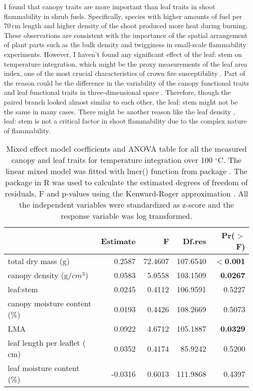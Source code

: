 \documentclass[12pt]{report}
\begin{document}
I found that canopy traits are more important than leaf traits in shoot flammability in shrub fuels.
Specifically, species with higher amounts of fuel per 70\,cm length and higher density of the shoot produced more heat during burning. These observations are consistent with the importance of the spatial arrangement of plant parts such as the bulk density \citep{pausas2012fire} and twigginess \citep{potts2022growth} in small-scale flammability experiments. However, I haven't found any significant effect of the leaf: stem on temperature integration, which might be the proxy measurements of the leaf area index, one of the most crucial characteristics of crown fire susceptibility \citep{ray2005micrometeorological}. Part of the reason could be the difference in the variability of the canopy functional traits and leaf functional traits in three-dimensional space \citep{kamoske2021leaf}. Therefore, though the paired branch looked almost similar to each other, the leaf: stem might not be the same in many cases. There might be another reason like the leaf density \citep{potts2022growth}, leaf: stem is not a critical factor in shoot flammability due to the complex nature of flammability.

\begin{table}[ht]
\centering
\caption{Mixed effect model coefficients and ANOVA table for all the measured canopy and leaf traits for temperature integration over 100 $^{\circ}$C. The linear mixed model was fitted with lmer() function from  package \citep{bates2009package}. The  package in R \citep{fox2013hypothesis} was used to calculate the estimated degrees of freedom of residuals, F and p-values using the Kenward-Roger approximation \citep{kenward1997small}. All the independent variables were standardized  as z-score and the response variable was log transformed.}
\vspace{0.2 cm}
\begin{tabular}{lrrrr}
  \hline
 &  Estimate & F  & Df.res & Pr($>$F) \\ 
  \hline 
  total dry mass (g) & 0.2587 & 72.4607  & 107.6540 & \textbf{$<$0.001} \\ 
  canopy density (g/{$cm^3$}) & 0.0583 & 5.0558  & 103.1509 & \textbf{0.0267} \\ 
  leaf:stem & 0.0245 & 0.4112  & 106.9591 & 0.5227 \\ 
  canopy moisture content (\%) & 0.0193 & 0.4426  & 108.2669 & 0.5073 \\ 
  LMA & 0.0922 & 4.6712 &  105.1887 & \textbf{0.0329} \\ 
  leaf length per leaflet (\,cm)  & 0.0352 & 0.4174 &  85.9242 & 0.5200 \\ 
  leaf moisture content (\%) & -0.0316 & 0.6013  & 111.9868 & 0.4397 \\ 
   \hline
\end{tabular}
\end{table}
\end{document}
